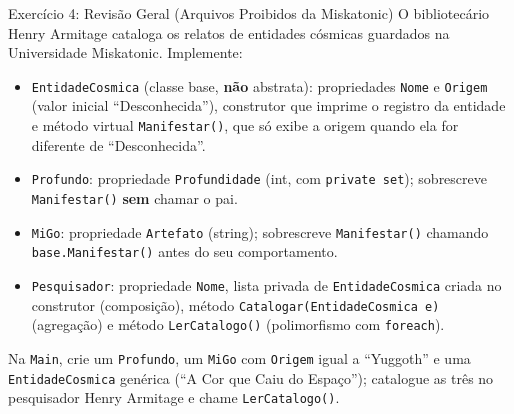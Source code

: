 \begin{exercicio}{Exercício 4: Revisão Geral (Arquivos Proibidos da Miskatonic)}
O bibliotecário Henry Armitage cataloga os relatos de entidades cósmicas guardados na
Universidade Miskatonic. Implemente:
\begin{itemize}
    \item \texttt{EntidadeCosmica} (classe base, \textbf{não} abstrata): propriedades
    \texttt{Nome} e \texttt{Origem} (valor inicial ``Desconhecida''), construtor que imprime o
    registro da entidade e método virtual \texttt{Manifestar()}, que só exibe a origem quando
    ela for diferente de ``Desconhecida''.
    \item \texttt{Profundo}: propriedade \texttt{Profundidade} (int, com
    \texttt{private set}); sobrescreve \texttt{Manifestar()} \textbf{sem} chamar o pai.
    \item \texttt{MiGo}: propriedade \texttt{Artefato} (string); sobrescreve
    \texttt{Manifestar()} chamando \texttt{base.Manifestar()} antes do seu comportamento.
    \item \texttt{Pesquisador}: propriedade \texttt{Nome}, lista privada de
    \texttt{EntidadeCosmica} criada no construtor (composição), método
    \texttt{Catalogar(EntidadeCosmica e)} (agregação) e método \texttt{LerCatalogo()}
    (polimorfismo com \texttt{foreach}).
\end{itemize}
Na \texttt{Main}, crie um \texttt{Profundo}, um \texttt{MiGo} com \texttt{Origem} igual a
``Yuggoth'' e uma \texttt{EntidadeCosmica} genérica (``A Cor que Caiu do Espaço''); catalogue
as três no pesquisador Henry Armitage e chame \texttt{LerCatalogo()}.
\end{exercicio}
